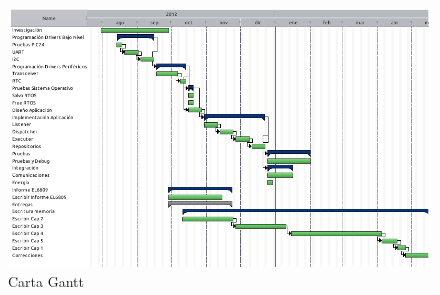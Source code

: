\documentclass[11pt,letterpaper]{article}
\begin{document}
\begin{figure}[!hb]
\centering
\caption{Carta Gantt} \label{gantt}
\includegraphics[width=\textwidth]{img/carta_gantt.png}
\end{figure}

% 	
\end{document}
